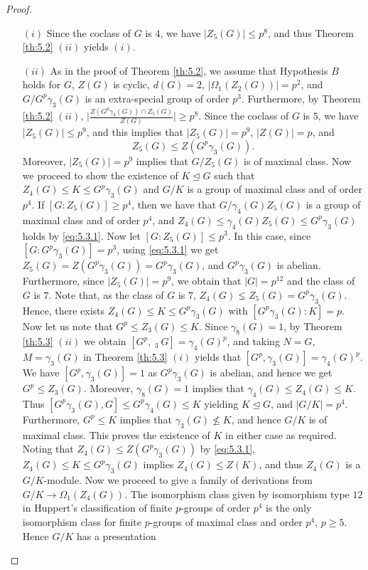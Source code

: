 \documentclass[preprint,sort&compress,12pt]{elsarticle}
\theoremstyle{definition}
\numberwithin{equation}{theorem}
\begin{document}
\begin{proof}
\begin{itemize}
\item [$(i)$] Since the coclass of $G$ is $4$, we have $|Z_5(G)|\le p^8$, and thus Theorem \ref{th:5.2} $(ii)$ yields $(i)$. 
\item [$(ii)$] As in the proof of Theorem \ref{th:5.2}, we assume that Hypothesis $B$ holds for $G$, $Z(G)$ is cyclic, $d(G)=2$, $|\Omega_1(Z_2(G))|=p^2$, and $G/G^p\gamma_3(G)$ is an extra-special group of order $p^3$. Furthermore, by Theorem \ref{th:5.2} $(ii)$, $\bigg|\frac{Z(G^p\gamma_3(G))\cap Z_5(G)}{Z(G)}\bigg|\ge p^8$. Since the coclass of $G$ is $5$, we have $|Z_5(G)|\le p^9$, and this implies that $|Z_5(G)|=p^9$, $|Z(G)|=p$, and 
\begin{equation}\label{eq:5.3.1} 
Z_5(G)\le Z(G^p\gamma_3(G)).
\end{equation}
\noindent Moreover, $|Z_5(G)|=p^9$ implies that $G/Z_5(G)$ is of maximal class. Now we proceed to show the existence of $K\unlhd G$ such that $Z_4(G)\le K\le G^p\gamma_3(G)$ and $G/K$ is a group of maximal class and of order $p^4$. If $[G:Z_5(G)]\ge p^4$, then we have that $G/\gamma_4(G)Z_5(G)$ is a group of maximal class and of order $p^4$, and $Z_4(G)\le \gamma_4(G)Z_5(G)\le G^p\gamma_3(G)$ holds by \eqref{eq:5.3.1}. Now let $[G:Z_5(G)]\le p^3$. In this case, since $[G:G^p\gamma_3(G)]=p^3$, using \eqref{eq:5.3.1} we get $Z_5(G)=Z(G^p\gamma_3(G))=G^p\gamma_3(G)$, and $G^p\gamma_3(G)$ is abelian. Furthermore, since $|Z_5(G)|=p^9$, we obtain that $|G|=p^{12}$ and the class of $G$ is $7$. Note that, as the class of $G$ is $7$, $Z_4(G)\lneq Z_5(G)=G^p\gamma_3(G)$. Hence, there exists $Z_4(G)\le K\le G^p\gamma_3(G)$ with $[G^p\gamma_3(G):K]=p$. Now let us note that $G^p\le Z_3(G)\le K$. Since $\gamma_8(G)=1$, by Theorem \ref{th:5.3} $(ii)$ we obtain $[G^p,\ _3\ G]=\gamma_4(G)^p$, and taking $N=G$, $M=\gamma_3(G)$ in Theorem \ref{th:5.3} $(i)$ yields that $[G^p,\gamma_3(G)]=\gamma_4(G)^p$. We have $[G^p, \gamma_3(G)]=1$ as $G^p\gamma_3(G)$ is abelian, and hence we get $G^p\le Z_3(G)$. Moreover, $\gamma_8(G)=1$ implies that $\gamma_4(G)\le Z_4(G)\le K$. Thus $[G^p\gamma_3(G), G]\le G^p\gamma_4(G)\le K$ yielding $K\unlhd G$, and $|G/K|=p^4$. Furthermore, $G^p\le K$ implies that $\gamma_3(G)\not\le K$, and hence $G/K$ is of maximal class. This proves the existence of $K$ in either case as required. Noting that $Z_4(G)\le Z(G^p\gamma_3(G))$ by \eqref{eq:5.3.1}, $Z_4(G)\le K\le G^p\gamma_3(G)$ implies $Z_4(G)\le Z(K)$, and thus $Z_4(G)$ is a $G/K$-module. Now we proceed to give a family of derivations from $G/K\rightarrow \Omega_1(Z_4(G))$. The isomorphism class given by isomorphism type $12$ in Huppert's classification of finite $p$-groups of order $p^4$ \cite[Chapter 3 p.\ 346]{BH} is the only isomorphism class for finite $p$-groups of maximal class and order $p^4$, $p\ge 5$. Hence $G/K$ has a presentation 

\end{itemize}
\end{proof}
\end{document}
